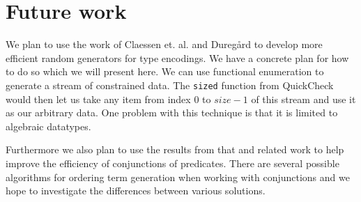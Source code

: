 \section{Future work}
We plan to use the work of Claessen et. al.
\cite{Claessen2014generating} and
Duregård \cite{Duregard}
to develop more efficient random
generators for type encodings.
We have a concrete plan for how to do 
so which we will present here.
We can use functional enumeration
to generate a stream of constrained
data. The \texttt{sized} function from
QuickCheck would then let us
take any item from index $0$ to $size-1$
of this stream and use it as our arbitrary
data. One problem with this technique is
that it is limited to algebraic datatypes.

Furthermore we also plan to use the
results from that and related work to
help improve the efficiency
of conjunctions of predicates.
There are several possible algorithms for
ordering term generation when working with
conjunctions and we hope to investigate the
differences between various solutions.
